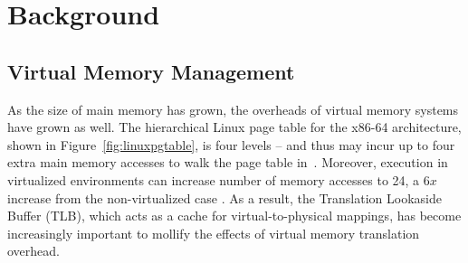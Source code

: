 %
%
%
%
%
%
%
\section{Background}
\subsection{Virtual Memory Management}


As the size of main memory has grown, the overheads of virtual memory systems
have grown as well.  The hierarchical Linux page table for the x86-64
architecture, shown in Figure~\ref{fig:linuxpgtable}, 
is four levels -- and thus may incur up to four extra main memory
accesses to walk the page table in~\cite{pgtable}.
Moreover, execution in virtualized environments can increase number of memory
accesses to 24, a $6x$ increase from the non-virtualized case 
\cite{amdnested,intelept,bhargava:2008:atp}.  As a result, the Translation
Lookaside Buffer (TLB), which acts as a cache for virtual-to-physical mappings,
has become increasingly important to mollify the effects of virtual memory
translation overhead.


